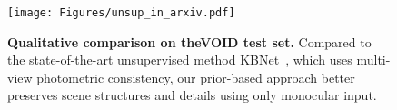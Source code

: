 \begin{figure}[t]
\centering
   \texttt{[image: Figures/unsup\_in\_arxiv.pdf]}
   \vspace{-3pt}
   \caption{\textbf{Qualitative comparison on theVOID test set.}
    Compared to the state-of-the-art unsupervised method KBNet~\cite{wong2021unsupervised}, which uses multi-view photometric consistency, our prior-based approach better preserves scene structures and details using only monocular input.
   } 
\label{fig:unsup_in}
\vspace{-4mm}
\end{figure}


